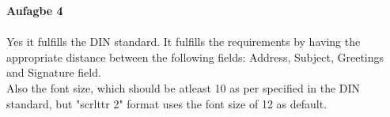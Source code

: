 \documentclass[foldmarks=true, foldmarks=BHLVmtP,subject=titled,version=last]{scrlttr2} %
\begin{document}

\textbf{Aufagbe 4}\\
\\
Yes it fulfills the DIN standard. It fulfills the requirements by having the appropriate distance between the following fields: Address, Subject, Greetings and Signature field.\\
 Also the font size, which should be atleast 10 as per specified in the DIN standard, but "scrlttr 2" format uses the font size of 12 as default.  
\end{document}
